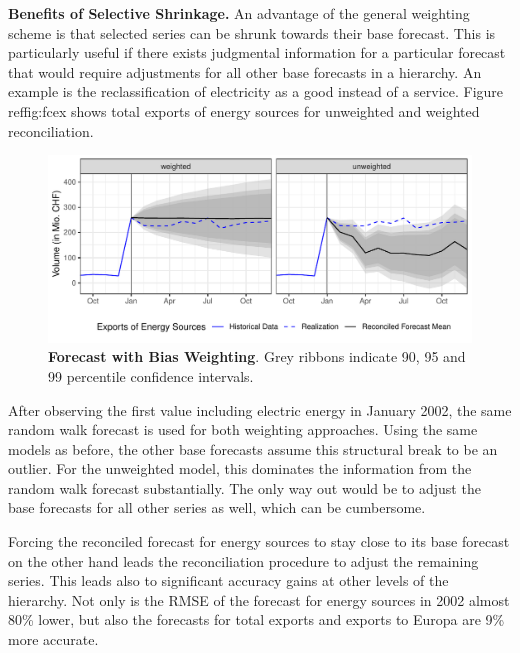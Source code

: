 \documentclass[a4paper,fleqn,11pt]{article}
\begin{document}
\noindent\textbf{Benefits of Selective Shrinkage.} An advantage of the general weighting scheme is that selected series can be shrunk towards their base forecast. This is particularly useful if there exists judgmental information for a particular forecast that would require adjustments for all other base forecasts in a hierarchy. An example is the reclassification of electricity as a good instead of a service. Figure ref{fig:fcex} shows total exports of energy sources for unweighted and weighted reconciliation.
\begin{figure}[H]
	\includegraphics[width=\textwidth]{fig/fig_electricity}
	\caption[Forecast with Bias Weighting]{\textbf{Forecast with Bias Weighting}. Grey ribbons indicate 90, 95 and 99 percentile confidence intervals.}\label{fig:fcex}
\end{figure}
After observing the first value including electric energy in January 2002, the same random walk forecast is used for both weighting approaches. Using the same models as before, the other base forecasts assume this structural break to be an outlier. For the unweighted model, this dominates the information from the random walk forecast substantially. The only way out would be to adjust the base forecasts for all other series as well, which can be cumbersome.

Forcing the reconciled forecast for energy sources to stay close to its base forecast on the other hand leads the reconciliation procedure to adjust the remaining series. This leads also to significant accuracy gains at other levels of the hierarchy. Not only is the RMSE of the forecast for energy sources in 2002 almost 80\% lower, but also the forecasts for total exports and exports to Europa are 9\% more accurate. 

\clearpage
\end{document}
